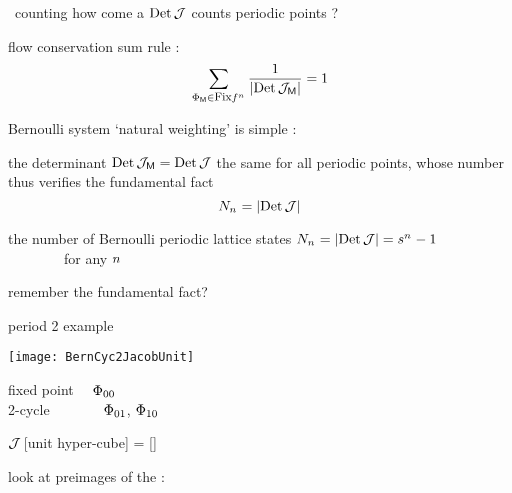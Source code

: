 \begin{frame}{\po\ counting}
how come a $\mbox{\rm Det}\,{\cal J}$ counts periodic points ?
\bigskip

\begin{block}{flow conservation sum rule :}
\[
\sum_{\Phi_{\mathsf{M}}{\in\mbox{\footnotesize Fix}f^{{n_{}}}}}
    \frac{1}{|\mbox{\rm Det}\,{\cal J}_{\mathsf{M}}|}
    =1
\]
\end{block}
\medskip

Bernoulli system `natural weighting' is simple :
\medskip

the determinant
$\mbox{\rm Det}\,{\cal J}_{\mathsf{M}}=\mbox{\rm Det}\,{\cal J}$ the same for all periodic points, whose
number thus verifies the {\color{blue}fundamental fact}
\[
N_{n_{}} = |\mbox{\rm Det}\,{\cal J}|
\] %

\medskip


\vfill
    \begin{block}{the number of Bernoulli periodic lattice states}
\(
N_{{n_{}}} = |\mbox{\rm Det}\,{\cal J}| = s^{{n_{}}} - 1
\) %
~~~~~~~~for any ${n_{}}$
    \end{block}
\end{frame} %

\begin{frame}{remember the fundamental fact?}
    \begin{block}{period 2 example}
\begin{center}
            \begin{minipage}[c]{0.32\textwidth}\begin{center}
\texttt{[image: BernCyc2JacobUnit]}
            \end{center}\end{minipage}
            \hspace{2ex}
            \begin{minipage}[c]{0.46\textwidth}
fixed point ~~$\Phi_{00}$\\
2-cycle ~~~~~~~$\Phi_{01}$, $\Phi_{10}$
            \end{minipage}
\end{center}
    \end{block}
\bigskip

${\cal J}\,$[unit hyper-cube] = [{\fundPip}]
\bigskip

look at preimages of the {\fundPip} :
\end{frame} %

